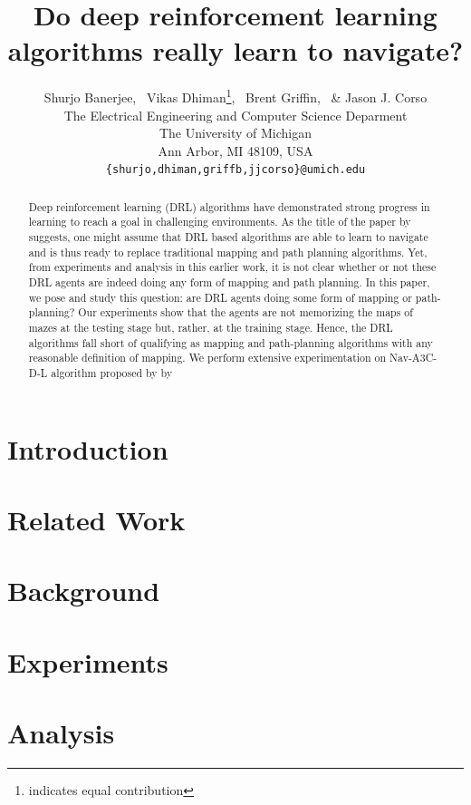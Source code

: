 \documentclass{article} %
\title{Do deep reinforcement learning algorithms really learn to navigate?}
\author{Shurjo Banerjee\footnotemark[1],%
  \, Vikas Dhiman\thanks{indicates equal contribution},%
  \, Brent Griffin,%
  \, \& Jason J. Corso\\
  The Electrical Engineering and Computer Science Deparment\\
The University of Michigan\\
Ann Arbor, MI 48109, USA \\
\texttt{\{shurjo,dhiman,griffb,jjcorso\}@umich.edu} \\
}
\begin{document}
\maketitle
\begin{abstract}
  Deep reinforcement learning (DRL) algorithms have demonstrated strong progress in learning to reach a goal in challenging environments.
  As the title of the paper by \cite{MiPaViICLR2017} suggests, one might assume that DRL based algorithms are able to learn to navigate and is thus ready to replace traditional mapping and path planning algorithms.
  Yet, from experiments and analysis in this earlier work, it is not clear whether or not these DRL agents are indeed doing any form of mapping and path planning.
  In this paper, we pose and study this question: are DRL agents doing some form of mapping or path-planning?  Our experiments show that the agents are not memorizing the maps of mazes at the testing stage but, rather, at the training stage.
  Hence, the DRL algorithms fall short of qualifying as mapping and path-planning algorithms with any reasonable definition of mapping.
  We perform extensive experimentation on Nav-A3C-D-L algorithm proposed by
  \cite{MiPaViICLR2017} by  
\end{abstract}

\section{Introduction}
%


\section{Related Work}


\section{Background}


%
\section{Experiments}


\section{Analysis}

\end{document}

